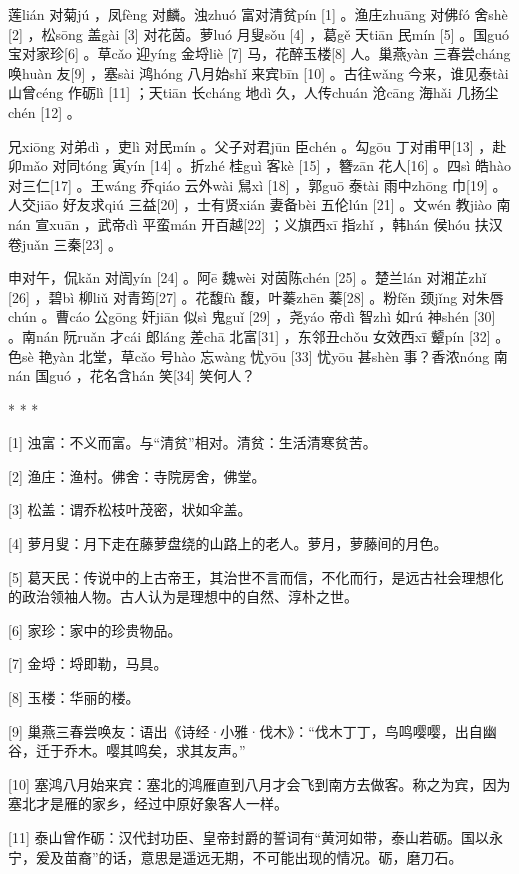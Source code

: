 \documentclass[12pt,UTF8]{ctexbook}
\begin{document}
莲lián 对菊jú ，凤fèng 对麟。浊zhuó 富对清贫pín [1] 。渔庄zhuāng 对佛fó 舍shè [2] ，松sōng 盖gài [3] 对花茵。萝luó 月叟sǒu [4] ，葛gě 天tiān 民mín [5] 。国guó 宝对家珍[6] 。草cǎo 迎yíng 金埒liè [7] 马，花醉玉楼[8] 人。巢燕yàn 三春尝cháng 唤huàn 友[9] ，塞sài 鸿hóng 八月始shǐ 来宾bīn [10] 。古往wǎng 今来，谁见泰tài 山曾céng 作砺lì [11] ；天tiān 长cháng 地dì 久，人传chuán 沧cāng 海hǎi 几扬尘chén [12] 。

兄xiōng 对弟dì ，吏lì 对民mín 。父子对君jūn 臣chén 。勾gōu 丁对甫甲[13] ，赴卯mǎo 对同tóng 寅yín [14] 。折zhé 桂guì 客kè [15] ，簪zān 花人[16] 。四sì 皓hào 对三仁[17] 。王wáng 乔qiáo 云外wài 舃xì [18] ，郭guō 泰tài 雨中zhōng 巾[19] 。人交jiāo 好友求qiú 三益[20] ，士有贤xián 妻备bèi 五伦lún [21] 。文wén 教jiào 南nán 宣xuān ，武帝dì 平蛮mán 开百越[22] ；义旗西xī 指zhǐ ，韩hán 侯hóu 扶汉卷juǎn 三秦[23] 。

申对午，侃kǎn 对訚yín [24] 。阿ē 魏wèi 对茵陈chén [25] 。楚兰lán 对湘芷zhǐ [26] ，碧bì 柳liǔ 对青筠[27] 。花馥fù 馥，叶蓁zhēn 蓁[28] 。粉fěn 颈jǐng 对朱唇chún 。曹cáo 公gōng 奸jiān 似sì 鬼guǐ [29] ，尧yáo 帝dì 智zhì 如rú 神shén [30] 。南nán 阮ruǎn 才cái 郎láng 差chā 北富[31] ，东邻丑chǒu 女效西xī 颦pín [32] 。色sè 艳yàn 北堂，草cǎo 号hào 忘wàng 忧yōu [33] 忧yōu 甚shèn 事？香浓nóng 南nán 国guó ，花名含hán 笑[34] 笑何人？



* * *



[1] 浊富：不义而富。与“清贫”相对。清贫：生活清寒贫苦。

[2] 渔庄：渔村。佛舍：寺院房舍，佛堂。

[3] 松盖：谓乔松枝叶茂密，状如伞盖。

[4] 萝月叟：月下走在藤萝盘绕的山路上的老人。萝月，萝藤间的月色。

[5] 葛天民：传说中的上古帝王，其治世不言而信，不化而行，是远古社会理想化的政治领袖人物。古人认为是理想中的自然、淳朴之世。

[6] 家珍：家中的珍贵物品。

[7] 金埒：埒即勒，马具。

[8] 玉楼：华丽的楼。

[9] 巢燕三春尝唤友：语出《诗经·小雅·伐木》：“伐木丁丁，鸟鸣嘤嘤，出自幽谷，迁于乔木。嘤其鸣矣，求其友声。”

[10] 塞鸿八月始来宾：塞北的鸿雁直到八月才会飞到南方去做客。称之为宾，因为塞北才是雁的家乡，经过中原好象客人一样。

[11] 泰山曾作砺：汉代封功臣、皇帝封爵的誓词有“黄河如带，泰山若砺。国以永宁，爰及苗裔”的话，意思是遥远无期，不可能出现的情况。砺，磨刀石。
\end{document}
